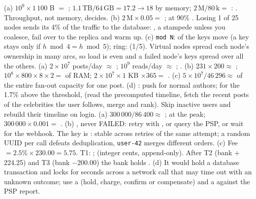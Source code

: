  (a) $10^9 \times 1\,100$ B $=$ ; $1.1\,\text{TB}/64\,\text{GB} = 17.2 \to 18$ by memory; $2\,\text{M}/80\,\text{k} =$ : . Throughput, not memory, decides. (b) $2\,\text{M} \times 0.05 =$ ; at 90\% .  Losing 1 of 25 nodes sends its 4\% of the traffic to the database: , a stampede unless you coalesce, fail over to the replica and warm up. (c) \texttt{mod N}:  of the keys move (a key stays only if $h \bmod 4 = h \bmod 5$); ring:  (1/5). Virtual nodes spread each node's ownership in many arcs, so load is even and a failed node's keys spread over all the others.
 (a) $2 \times 10^7$ posts/day $\approx$ ; $10^9$ reads/day $\approx$ ; . (b) $231 \times 200 \approx$ ; $10^8 \times 800 \times 8 \times 2 =$  of RAM; $2 \times 10^7 \times 1$ KB $\times 365 =$ . (c) $5 \times 10^7/46\,296 \approx$  of the entire fan-out capacity for one post. (d) : push for normal authors; for the 1.7\% above the threshold,  (read the precomputed timeline, fetch the recent posts of the celebrities the user follows, merge and rank). Skip inactive users and rebuild their timeline on login.
 (a) $300\,000/86\,400 \approx$ ;  at the peak; $300\,000 \times 0.001 =$ . (b) , never FAILED: retry with , or query the PSP, or wait for the webhook. The key is : stable across retries of the same attempt; a random UUID per call defeats deduplication, \texttt{user-42} merges different orders. (c) Fee $= 2.5\% \times 230.00 = 5.75$. T1: ;  (integer cents, append-only). After T2 (bank $+$224.25) and T3 (bank $-$200.00) the bank holds . (d) It would hold a database transaction and locks for seconds across a network call that may time out with an unknown outcome; use a  (hold, charge, confirm or compensate) and a  against the PSP report.
